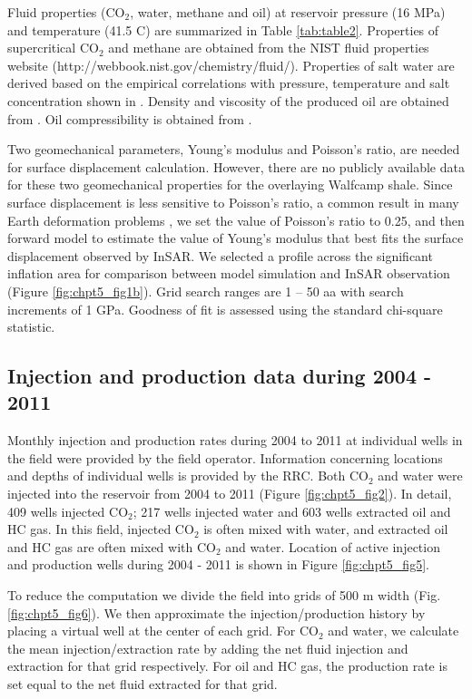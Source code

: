 Fluid properties (CO$_{2}$, water, methane and oil) at reservoir pressure (16 MPa) and temperature (41.5 \textordmasculine C) are summarized in Table \ref{tab:table2}.  Properties of supercritical CO$_{2}$ and methane are obtained from the NIST fluid properties website (http://webbook.nist.gov/chemistry/fluid/).  Properties of salt water are derived based on the empirical correlations with pressure, temperature and salt concentration shown in \citet{mathias2009screening}.  Density and viscosity of the produced oil are obtained from \citet{vest1970oil}.  Oil compressibility is obtained from \citet{satter2008practical}.

Two geomechanical parameters, Young’s modulus and Poisson’s ratio, are needed for surface displacement calculation.  However, there are no publicly available data for these two geomechanical properties for the overlaying Walfcamp shale.  Since surface displacement is less sensitive to Poisson’s ratio, a common result in many Earth deformation problems \cite[e.g.,][]{bevis2005seasonal}, we set the value of Poisson’s ratio to 0.25, and then forward model to estimate the value of Young’s modulus that best fits the surface displacement observed by InSAR. We selected a profile across the significant inflation area for comparison between model simulation and InSAR observation (Figure \ref{fig:chpt5_fig1b}).  Grid search ranges are 1 – 50 aa with search increments of 1 GPa.  Goodness of fit is assessed using the standard chi-square statistic.

\subsection{Injection and production data during 2004 - 2011} \label{section4.3}
Monthly injection and production rates during 2004 to 2011 at individual wells in the field were provided by the field operator. Information concerning locations and depths of individual wells is provided by the RRC.  Both CO$_{2}$ and water were injected into the reservoir from 2004 to 2011 (Figure \ref{fig:chpt5_fig2}).  In detail, 409 wells injected CO$_{2}$; 217 wells injected water and 603 wells extracted oil and HC gas.  In this field, injected CO$_{2}$ is often mixed with water, and extracted oil and HC gas are often mixed with CO$_{2}$ and water.  Location of active injection and production wells during 2004 - 2011 is shown in Figure \ref{fig:chpt5_fig5}.  

To reduce the computation we divide the field into grids of 500 m width (Fig. \ref{fig:chpt5_fig6}). We then approximate the injection/production history by placing a virtual well at the center of each grid.  For CO$_{2}$ and water, we calculate the mean injection/extraction rate by adding the net fluid injection and extraction for that grid respectively.  For oil and HC gas, the production rate is set equal to the net fluid extracted for that grid. 

